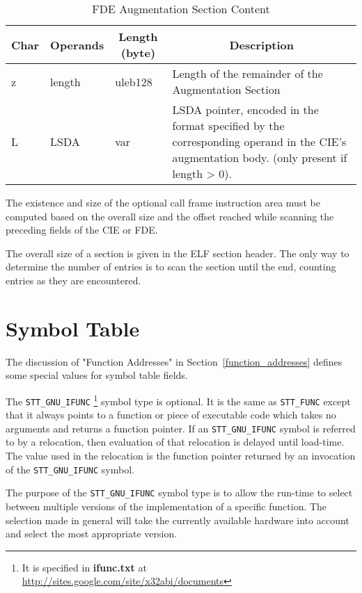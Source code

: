 \begin{table}[H]
\Hrule
\caption{FDE Augmentation Section Content}
\label{format-fdeaug}
\begin{center}
\begin{tabular}{l|p{6em}|l|p{16em}}
  \multicolumn{1}{c}{Char}
         & \multicolumn{1}{c}{Operands}
         & \multicolumn{1}{c}{Length (byte)}
         & \multicolumn{1}{c}{Description} \\ \hline
  z & length & uleb128 & Length of the remainder of the
                                        Augmentation Section \\
  L & LSDA & var & LSDA pointer, encoded in the
                   format specified by the
                   corresponding operand in the CIE's
                   augmentation body. (only present if length > 0). \\
\hline
    \end{tabular}
  \end{center}
\Hrule
\end{table}
The existence and size of the optional call frame instruction area must
be computed
based on the overall size and the offset reached while scanning the
preceding fields of the CIE or FDE.

The overall size of a  section is given in the ELF section
header.  The only way to determine the number of entries is to scan
the section until the end, counting entries as they are encountered.

\section{Symbol Table}

The discussion of "Function Addresses" in Section~\ref{function_addresses}
defines some special values for symbol table fields.

The \texttt{STT_GNU_IFUNC}
\footnote{It is specified in {\bf ifunc.txt}
at \url{http://sites.google.com/site/x32abi/documents}}
symbol type is optional. It is the same as
\texttt{STT_FUNC} except that it always points to a function or piece of
executable code which takes no arguments and returns a function pointer.
If an \texttt{STT_GNU_IFUNC} symbol is referred to by a relocation, then
evaluation of that relocation is delayed until load-time.  The value
used in the relocation is the function pointer returned by an invocation
of the \texttt{STT_GNU_IFUNC} symbol.
 
The purpose of the \texttt{STT_GNU_IFUNC} symbol type is to allow the
run-time to select between multiple versions of the implementation of
a specific function.  The selection made in general will take the
currently available hardware into account and select the most
appropriate version.

